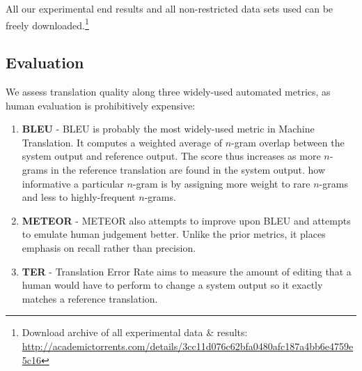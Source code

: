 All our experimental end results and all non-restricted data sets used can be
freely downloaded.\footnote{Download archive of all experimental data \& results:
\url{http://academictorrents.com/details/3cc11d076c62bfa0480afc187a4bb6e4759e5c16}}

\subsection{Evaluation}

We assess translation quality along three widely-used automated metrics,
as human evaluation is prohibitively expensive:

\begin{enumerate} %
\item \textbf{BLEU} - BLEU \citep{BLEU} is probably the most widely-used metric
in Machine Translation. It computes a weighted average of $n$-gram overlap
between the system output and reference output. The score thus increases as
more $n$-grams in the reference translation are found in the system output.
how informative a particular $n$-gram is by assigning more weight to rare
$n$-grams and less to highly-frequent $n$-grams.
\item \textbf{METEOR} - METEOR \citep{METEOR} also attempts to improve upon
  BLEU and attempts to emulate human judgement better. Unlike the prior
  metrics, it places emphasis on recall rather than precision.
\item \textbf{TER} - Translation Error Rate \cite{TER} aims to measure the
amount of editing that a human would have to perform to change a system output
so it exactly matches a reference translation.
\end{enumerate}

